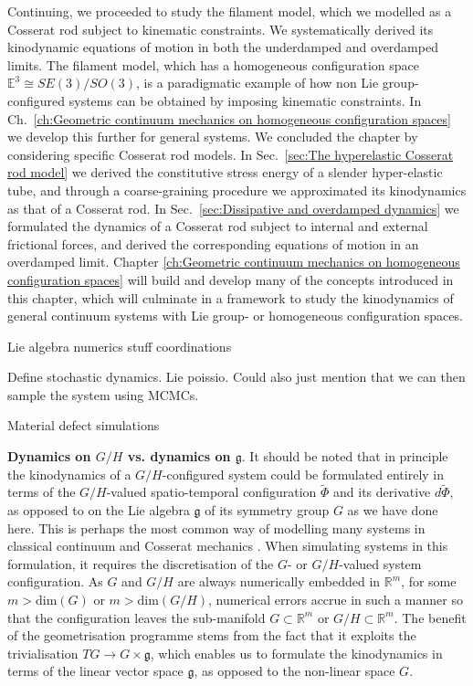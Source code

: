Continuing, we proceeded to study the filament model, which we modelled as a Cosserat rod subject to kinematic constraints. We systematically derived its kinodynamic equations of motion in both the underdamped and overdamped limits. The filament model, which has a homogeneous configuration space $\mathbb{E}^3 \cong SE(3)/SO(3)$, is a paradigmatic example of how non Lie group-configured systems can be obtained by imposing kinematic constraints. In Ch.~\ref{ch:Geometric continuum mechanics on homogeneous configuration spaces} we develop this further for general systems. We concluded the chapter by considering specific Cosserat rod models. In Sec.~\ref{sec:The hyperelastic Cosserat rod model} we derived the constitutive stress energy of a slender hyper-elastic tube, and through a coarse-graining procedure we approximated its kinodynamics as that of a Cosserat rod. In Sec.~\ref{sec:Dissipative and overdamped dynamics} we formulated the dynamics of a Cosserat rod subject to internal and external frictional forces, and derived the corresponding equations of motion in an overdamped limit. Chapter \ref{ch:Geometric continuum mechanics on homogeneous configuration spaces} will build and develop many of the concepts introduced in this chapter, which will culminate in a framework to study the kinodynamics of general continuum systems with Lie group- or homogeneous configuration spaces.



Lie algebra numerics stuff  coordinations

Define stochastic dynamics. Lie poissio. Could also just mention that we can then sample the system using MCMCs.

Material defect simulations


\textbf{Dynamics on $G/H$ vs. dynamics on $\mathfrak{g}$}. It should be noted that in principle the kinodynamics of a $G/H$-configured system could be formulated entirely in terms of the $G/H$-valued spatio-temporal configuration $\tilde{\Phi}$ and its derivative $d \tilde{\Phi}$, as opposed to on the Lie algebra $\mathfrak{g}$ of its symmetry group $G$ as we have done here. This is perhaps the most common way of modelling many systems in classical continuum and Cosserat mechanics \citep{naughtonElasticaCompliantMechanics2021, powersDynamicsFilamentsMembranes2010, stefanouThreedimensionalCosseratHomogenization2008, caoNonlinearDynamicsElastic2008}. When simulating systems in this formulation, it requires the discretisation of the $G$- or $G/H$-valued system configuration. As $G$ and $G/H$ are always numerically embedded in $\mathbb{R}^m$, for some $m > \text{dim}(G)$ or $m > \text{dim}(G/H)$, numerical errors accrue in such a manner so that the configuration leaves the sub-manifold $G \subset \mathbb{R}^m$ or $G/H \subset \mathbb{R}^m$. The benefit of the geometrisation programme stems from the fact that it exploits the trivialisation $TG \to G \times \mathfrak{g}$, which enables us to formulate the kinodynamics in terms of the linear vector space $\mathfrak{g}$, as opposed to the non-linear space $G$.

